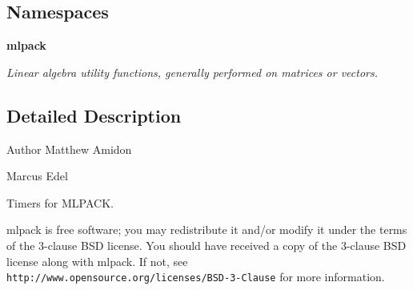\subsection*{Namespaces}
\begin{DoxyCompactItemize}
\item 
 {\bf mlpack}
\begin{DoxyCompactList}\small\item\em Linear algebra utility functions, generally performed on matrices or vectors. \end{DoxyCompactList}\end{DoxyCompactItemize}


\subsection{Detailed Description}
\begin{DoxyAuthor}{Author}
Matthew Amidon 

Marcus Edel
\end{DoxyAuthor}
Timers for M\+L\+P\+A\+CK.

mlpack is free software; you may redistribute it and/or modify it under the terms of the 3-\/clause B\+SD license. You should have received a copy of the 3-\/clause B\+SD license along with mlpack. If not, see {\tt http\+://www.\+opensource.\+org/licenses/\+B\+S\+D-\/3-\/\+Clause} for more information. 